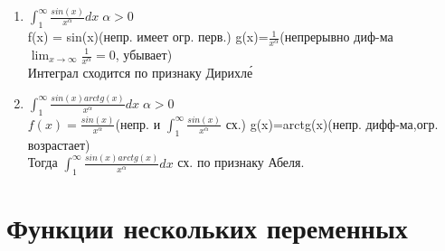 \documentclass[12pt]{article}
\begin{document}
    \begin{enumerate}
        \item $\int_{1}^{\infty}\frac{sin(x)}{x^\alpha}dx \; \alpha>0$\\
        f(x) = sin(x)(непр. имеет огр. перв.) \; g(x)=$\frac{1}{x^\alpha}$(непрерывно диф-ма $\lim_{x \to \infty}\frac{1}{x^\alpha}=0$, убывает)\\
        Интеграл сходится по признаку Дирихле́
        \item $\int_{1}^{\infty}\frac{sin(x)arctg(x)}{x^\alpha}dx \; \alpha>0$\\
        $f(x)=\frac{sin(x)}{x^\alpha}$(непр. и $\int_{1}^{\infty}\frac{sin(x)}{x^\alpha}$ сх.) \; g(x)=arctg(x)(непр. дифф-ма,огр. возрастает)\\
        Тогда $\int_{1}^{\infty}\frac{sin(x)arctg(x)}{x^\alpha}dx$ сх. по признаку Абеля.
    \end{enumerate}

    \section{Функции нескольких переменных}
\end{document}
